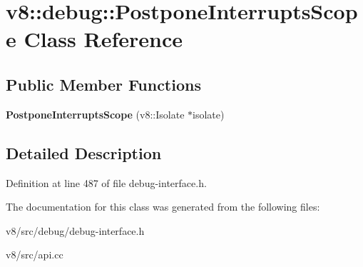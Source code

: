 \hypertarget{classv8_1_1debug_1_1PostponeInterruptsScope}{}\section{v8\+:\+:debug\+:\+:Postpone\+Interrupts\+Scope Class Reference}
\label{classv8_1_1debug_1_1PostponeInterruptsScope}
\subsection*{Public Member Functions}
\begin{DoxyCompactItemize}
\item 
\mbox{\label{classv8_1_1debug_1_1PostponeInterruptsScope_a826a568c2d82a25856a043b857fc1c59}} 
{\bfseries Postpone\+Interrupts\+Scope} (v8\+::\+Isolate $\ast$isolate)
\end{DoxyCompactItemize}


\subsection{Detailed Description}


Definition at line 487 of file debug-\/interface.\+h.



The documentation for this class was generated from the following files\+:\begin{DoxyCompactItemize}
\item 
v8/src/debug/debug-\/interface.\+h\item 
v8/src/api.\+cc\end{DoxyCompactItemize}
